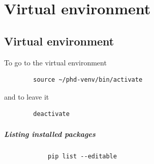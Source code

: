 \chapter{Virtual environment}


\section{Virtual environment}
To go to the virtual environment

\begin{verbatim}
        source ~/phd-venv/bin/activate
\end{verbatim}

and to leave it

\begin{verbatim}
        deactivate
\end{verbatim}

\paragraph{Listing installed packages}
\begin{verbatim}
            pip list --editable
\end{verbatim}
